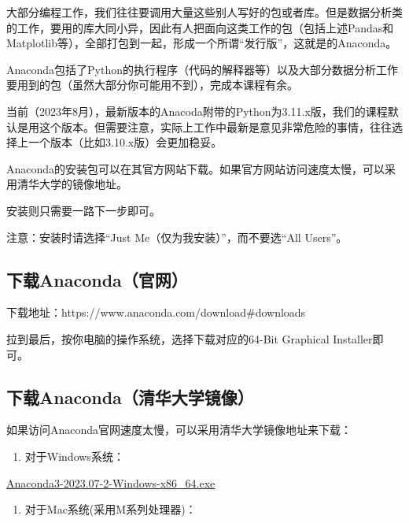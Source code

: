 \documentclass[
  letterpaper,
  DIV=11,
  numbers=noendperiod]{scrreprt}
\providecommand{\tightlist}{%
  \setlength{\itemsep}{0pt}\setlength{\parskip}{0pt}}\usepackage{longtable,booktabs,array}
\begin{document}
大部分编程工作，我们往往要调用大量这些别人写好的包或者库。但是数据分析类的工作，要用的库大同小异，因此有人把面向这类工作的包（包括上述Pandas和Matplotlib等），全部打包到一起，形成一个所谓``发行版''，这就是的Anaconda。

Anaconda包括了Python的执行程序（代码的解释器等）以及大部分数据分析工作要用到的包（虽然大部分你可能用不到），完成本课程有余。

当前（2023年8月），最新版本的Anacoda附带的Python为3.11.x版，我们的课程默认是用这个版本。但需要注意，实际上工作中最新是意见非常危险的事情，往往选择上一个版本（比如3.10.x版）会更加稳妥。

Anaconda的安装包可以在其官方网站下载。如果官方网站访问速度太慢，可以采用清华大学的镜像地址。

安装则只需要一路下一步即可。

注意：安装时请选择``Just Me（仅为我安装）''，而不要选``All Users''。

\hypertarget{ux4e0bux8f7danacondaux5b98ux7f51}{%
\subsection{下载Anaconda（官网）}\label{ux4e0bux8f7danacondaux5b98ux7f51}}

下载地址：https://www.anaconda.com/download\#downloads

拉到最后，按你电脑的操作系统，选择下载对应的64-Bit Graphical
Installer即可。

\hypertarget{ux4e0bux8f7danacondaux6e05ux534eux5927ux5b66ux955cux50cf}{%
\subsection{下载Anaconda（清华大学镜像）}\label{ux4e0bux8f7danacondaux6e05ux534eux5927ux5b66ux955cux50cf}}

如果访问Anaconda官网速度太慢，可以采用清华大学镜像地址来下载：

\begin{enumerate}
\def\labelenumi{\arabic{enumi}.}
\tightlist
\item
  对于Windows系统：
\end{enumerate}

\href{https://mirrors.tuna.tsinghua.edu.cn/anaconda/archive/Anaconda3-2023.07-2-Windows-x86_64.exe}{Anaconda3-2023.07-2-Windows-x86\_64.exe}

\begin{enumerate}
\def\labelenumi{\arabic{enumi}.}
\tightlist
\item
  对于Mac系统(采用M系列处理器)：
\end{enumerate}
\end{document}
